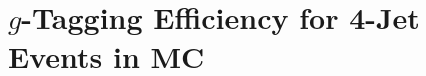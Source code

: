 









\FloatBarrier
\section[g-Tagging Efficiency for 4-Jet Events in MC]{$g$-Tagging Efficiency for 4-Jet Events in MC}

